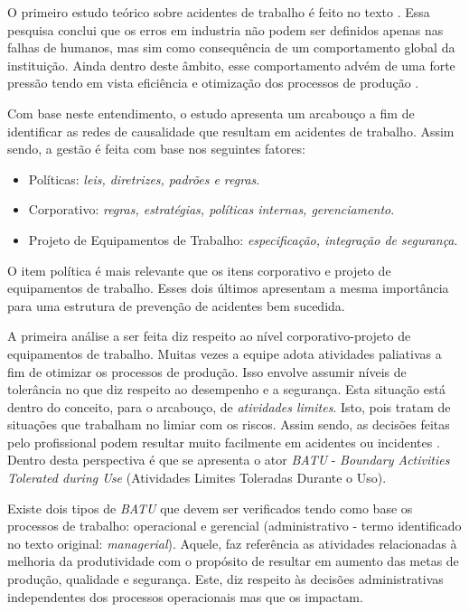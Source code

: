 O primeiro estudo teórico sobre acidentes de trabalho é feito no texto \cite{riskoldschool}. Essa pesquisa conclui que os erros em industria não podem ser definidos apenas nas falhas de humanos, mas sim como consequência de um comportamento global da instituição. Ainda dentro deste âmbito, esse comportamento advém de uma forte pressão tendo em vista eficiência e otimização dos processos de produção \cite{riskoldschool,safety}.

Com base neste entendimento, o estudo \cite{safety} apresenta um arcabouço a fim de identificar as redes de causalidade que resultam em acidentes de trabalho. Assim sendo, a gestão é feita com base nos seguintes fatores: 
\begin{itemize}
    \item Políticas: \textit{leis, diretrizes, padrões e regras}.
    \item Corporativo: \textit{regras, estratégias, políticas internas, gerenciamento}.
    \item Projeto de Equipamentos de Trabalho: \textit{especificação, integração de segurança}.
\end{itemize}

O item política é mais relevante que os itens corporativo e projeto de equipamentos de trabalho. Esses dois últimos apresentam a mesma importância para uma estrutura de prevenção de acidentes bem sucedida. 

A primeira análise a ser feita diz respeito ao nível corporativo-projeto de equipamentos de trabalho. Muitas vezes a equipe adota atividades paliativas a fim de otimizar os processos de produção. Isso envolve assumir níveis de tolerância no que diz respeito ao desempenho e a segurança. Esta situação está dentro do conceito, para o arcabouço, de \textit{atividades limites}. Isto, pois tratam de situações que trabalham no limiar com os riscos. Assim sendo, as decisões feitas pelo profissional podem resultar muito facilmente em acidentes ou incidentes \cite{safety}. Dentro desta perspectiva é que se apresenta o ator \textit{BATU} - \textit{Boundary Activities Tolerated during Use} (Atividades Limites Toleradas Durante o Uso).

Existe dois tipos de \textit{BATU} que devem ser verificados tendo como base os processos de trabalho: operacional e gerencial (administrativo - termo identificado no texto original: \textit{managerial}). Aquele, faz referência as atividades relacionadas à melhoria da produtividade com o propósito de resultar em aumento das metas de produção, qualidade e segurança. Este, diz respeito às decisões administrativas independentes dos processos operacionais mas que os impactam.

